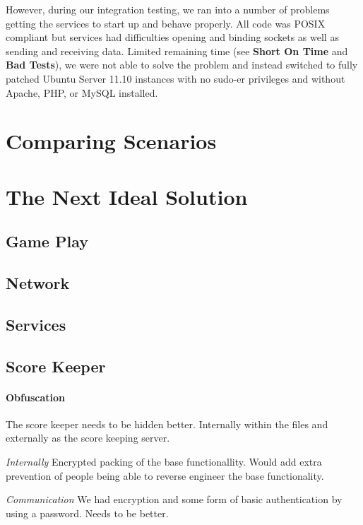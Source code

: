 \documentclass[10pt]{article}
\begin{document}
However, during our integration testing, we ran into a number of problems
getting the services to start up and behave properly. All code was POSIX
compliant but services had difficulties opening and binding sockets as well as
sending and receiving data. Limited remaining time (see \textbf{Short On Time}
and \textbf{Bad Tests}), we were not able to solve the problem and instead
switched to fully patched Ubuntu Server 11.10 instances with no sudo-er
privileges and without Apache, PHP, or MySQL installed. 

\section{Comparing Scenarios}


\section{The Next Ideal Solution}

\subsection{Game Play}

\subsection{Network}

\subsection{Services}

\subsection{Score Keeper}

\paragraph{Obfuscation}
The score keeper needs to be hidden better. Internally within the files and externally
as the score keeping server.

\textit{Internally}
Encrypted packing of the base functionallity. Would add extra prevention of people being
able to reverse engineer the base functionality.

\textit{Communication}
We had encryption and some form of basic authentication by using a password.
Needs to be better.
\end{document}
